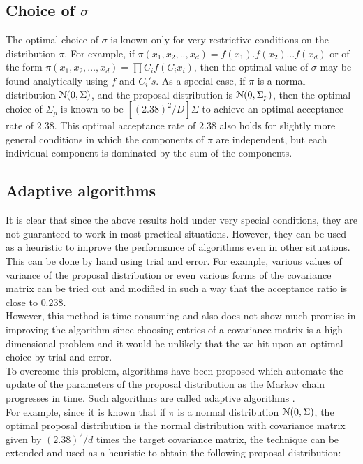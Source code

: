 \documentclass[letterpaper,english,10pt]{article}
\begin{document}
\subsection{Choice of $\sigma$}
The optimal choice of $\sigma$ is known only for very restrictive conditions on the distribution $\pi$. For example, if $\pi(x_1, x_2, .., x_d) = f(x_1).f(x_2) \dots f(x_d)$ or of the form $\pi(x_1, x_2, \dots, x_d) = \prod C_i f(C_i x_i)$, then the optimal value of $\sigma$ may be found analytically using $f$ and $C_i's$\cite{Rosenthal10optimalproposal}. As a special case, if $\pi$ is a normal distribution $\mathcal{N}(0,\Sigma)$, and the proposal distribution is $\mathcal{N}(0,\Sigma_p)$, then the optimal choice of $\Sigma_p$ is known to be $[ (2.38)^2 / D ] \Sigma$ to achieve an optimal acceptance rate of $2.38$. This optimal acceptance rate of $2.38$ also holds for slightly more general conditions in which the components of $\pi$ are independent, but each individual component is dominated by the sum of the components.

\subsection{Adaptive algorithms}
It is clear that since the above results hold under very special conditions, they are not guaranteed to work in most practical situations. However, they can be used as a heuristic to improve the performance of algorithms even in other situations. This can be done by hand using trial and error. For example, various values of variance of the proposal distribution or even various forms of the covariance matrix can be tried out and modified in such a way that the acceptance ratio is close to $0.238$.\\

However, this method is time consuming and also does not show much promise in improving the algorithm since choosing entries of a covariance matrix is a high dimensional problem and it would be unlikely that the we hit upon an optimal choice by trial and error.\\

To overcome this problem, algorithms have been proposed which automate the update of the parameters of the proposal distribution as the Markov chain progresses in time. Such algorithms are called adaptive algorithms \cite{Rosenthal10optimalproposal}.\\

For example, since it is known that if $\pi$ is a normal distribution $\mathcal{N}(0,\Sigma)$, the optimal proposal distribution is the normal distribution with covariance matrix given by $(2.38)^2 / d$ times the target covariance matrix, the technique can be extended and used as a heuristic to obtain the following proposal distribution:
\end{document}
